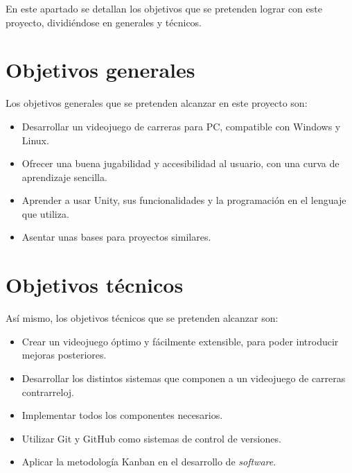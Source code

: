 En este apartado se detallan los objetivos que se pretenden lograr con este proyecto, dividiéndose en generales y técnicos.

\section{Objetivos generales}

Los objetivos generales que se pretenden alcanzar en este proyecto son:

\begin{itemize}
\tightlist
	\item Desarrollar un videojuego de carreras para PC, compatible con Windows y Linux.
	\item Ofrecer una buena jugabilidad y accesibilidad al usuario, con una curva de aprendizaje sencilla.
	\item Aprender a usar Unity, sus funcionalidades y la programación en el lenguaje que utiliza.
	\item Asentar unas bases para proyectos similares.
\end{itemize}

\section{Objetivos técnicos}

Así mismo, los objetivos técnicos que se pretenden alcanzar son:

\begin{itemize}
\tightlist
	\item Crear un videojuego óptimo y fácilmente extensible, para poder introducir mejoras posteriores.
	\item Desarrollar los distintos sistemas que componen a un videojuego de carreras contrarreloj.
	\item Implementar todos los componentes necesarios.
	\item Utilizar Git y GitHub como sistemas de control de versiones.
	\item Aplicar la metodología Kanban en el desarrollo de \textit{software}.
\end{itemize}